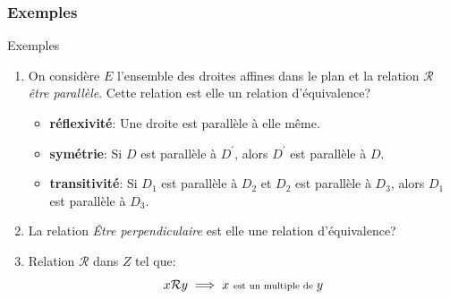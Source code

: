 \documentclass[usenames,dvipsnames]{beamer}
\begin{document}
\begin{frame}[<+->]
  \frametitle{Exemples}
 \begin{block}{Exemples}
   \begin{enumerate}
     \item On considère $E$ l'ensemble des droites affines dans le plan et la
       relation $\mathcal{R}$ \emph{\alert{être parallèle}}. Cette relation est
       elle un relation d'équivalence?
       \begin{itemize}
         \scriptsize
       \item \textbf{réflexivité}: Une droite est parallèle à elle même.\\[4pt]
         \item \textbf{symétrie}: Si $D$ est parallèle à $D^{'}$, alors $D^{'}$
           est parallèle à $D$.\\[4pt]
         \item \textbf{transitivité}: Si $D_1$ est parallèle à $D_2$ et $D_2$
           est parallèle à $D_3$, alors $D_1$ est parallèle à $D_3$.
       \end{itemize}
     \item La relation \emph{\alert{Être perpendiculaire}} est elle une relation
       d'équivalence?
     \item Relation $\mathcal{R}$ dans $Z$ tel que:
       \begin{equation*}
         x \mathcal{R} y \implies x \text{ \scriptsize est un multiple de }  y
       \end{equation*}
   \end{enumerate}
 \end{block} 
\end{frame}
\end{document}
